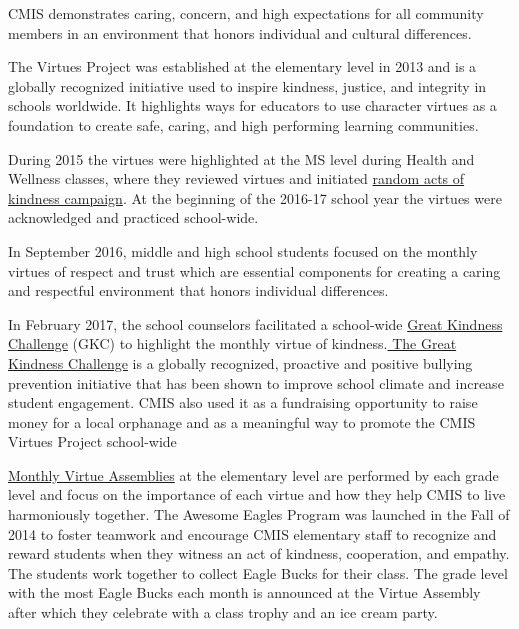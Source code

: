 \begin{findings}
CMIS demonstrates caring, concern, and high expectations for all community members in an environment that honors individual and cultural differences.

The Virtues Project was established at the elementary level in 2013 and is a globally recognized initiative used to inspire kindness, justice, and integrity in schools worldwide. It highlights ways for educators to use character virtues as a foundation to create safe, caring, and high performing learning communities. 

During 2015 the virtues were highlighted at the MS level during Health and Wellness classes, where they reviewed virtues and initiated \href{https://docs.google.com/forms/d/e/1FAIpQLScP9Fpphz10qaY0S4RO3VLKBQ54RC3WQdP-FGIBbPOcXzMwpQ/viewform?c=0&w=1}{random acts of kindness campaign}. At the beginning of the 2016-17 school year the virtues were acknowledged and practiced school-wide.


In September 2016, middle and high school students focused on the monthly virtues of respect  and trust  which are essential  components for creating a caring and respectful environment that honors individual differences.

In February 2017, the school counselors facilitated a school-wide \href{https://docs.google.com/a/cmis.ac.th/document/d/1PsHRple71FshloSGrqvYHgQQCYx9_CwCsbtlMAkb-Aw/edit?usp=sharing}{Great Kindness Challenge} (GKC) to highlight the monthly virtue of kindness.\href{https://dochub.com/roneldanelcapadona/gDPKV2/gkc?dt=ysuio255qfhtbryf}{ The Great Kindness Challenge} is a globally recognized, proactive and positive bullying prevention initiative that has been shown to improve school climate and increase student engagement. CMIS also used it as a fundraising opportunity to raise money for a local orphanage and as a meaningful way to promote the CMIS Virtues Project school-wide

\href{https://docs.google.com/a/cmis.ac.th/document/d/1Mv1xjTpbY36naur8SDt9GanKNfR7YtYVL-bWwGLPSHo/edit?usp=sharing}{Monthly Virtue Assemblies} at the elementary level are performed by each grade level and focus on the importance of each virtue and how they help CMIS to live harmoniously together. The Awesome Eagles Program was launched in the Fall of 2014 to foster teamwork and encourage CMIS elementary staff to recognize and reward students when they witness an act of kindness, cooperation, and empathy. The students work together to collect Eagle Bucks for their class. The grade level with the most Eagle  Bucks each month is announced at the Virtue Assembly after which they celebrate with a class trophy and an ice cream party.


\end{findings}
